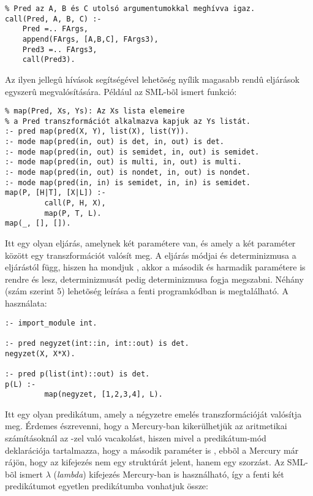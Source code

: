 \begin{verbatim}
% Pred az A, B és C utolsó argumentumokkal meghívva igaz.
call(Pred, A, B, C) :- 
    Pred =.. FArgs, 
    append(FArgs, [A,B,C], FArgs3), 
    Pred3 =.. FArgs3,
    call(Pred3).
\end{verbatim}

Az ilyen jellegû  hívások segítségével lehetõség nyílik magasabb rendû
eljárások egyszerû megvalósítására. Például az SML-bõl ismert  funkció:

\begin{verbatim}
% map(Pred, Xs, Ys): Az Xs lista elemeire 
% a Pred transzformációt alkalmazva kapjuk az Ys listát.
:- pred map(pred(X, Y), list(X), list(Y)).
:- mode map(pred(in, out) is det, in, out) is det.
:- mode map(pred(in, out) is semidet, in, out) is semidet.
:- mode map(pred(in, out) is multi, in, out) is multi.
:- mode map(pred(in, out) is nondet, in, out) is nondet.
:- mode map(pred(in, in) is semidet, in, in) is semidet.
map(P, [H|T], [X|L]) :-
         call(P, H, X),
         map(P, T, L).
map(_, [], []).
\end{verbatim}

Itt  egy olyan eljárás, amelynek két paramétere van, és amely a két
paraméter között egy transzformációt valósít meg. A  eljárás módjai
és determinizmusa a  eljárástól függ, hiszen ha  mondjuk
, akkor a  második és harmadik paramétere
is rendre  és  lesz,  determinizmusát pedig 
determinizmusa fogja megszabni. Néhány (szám szerint 5) lehetõség leírása a
fenti programkódban is megtalálható. A  használata:

\begin{verbatim}
:- import_module int.

:- pred negyzet(int::in, int::out) is det.
negyzet(X, X*X).

:- pred p(list(int)::out) is det.
p(L) :-
         map(negyzet, [1,2,3,4], L).
\end{verbatim}

Itt  egy olyan predikátum, amely a négyzetre emelés transzformációját
valósítja meg. Érdemes észrevenni, hogy a Mercury-ban kikerülhetjük az aritmetikai
számításoknál az -zel való vacakolást, hiszen mivel a 
predikátum-mód deklarációja tartalmazza, hogy a második paraméter is ,
ebbõl a Mercury már rájön, hogy az  kifejezés nem egy  struktúrát
jelent, hanem egy szorzást.
\br
Az SML-bõl ismert $\lambda$ (\emph{lambda}) kifejezés Mercury-ban is használható,
így a fenti két predikátumot egyetlen predikátumba vonhatjuk össze:

